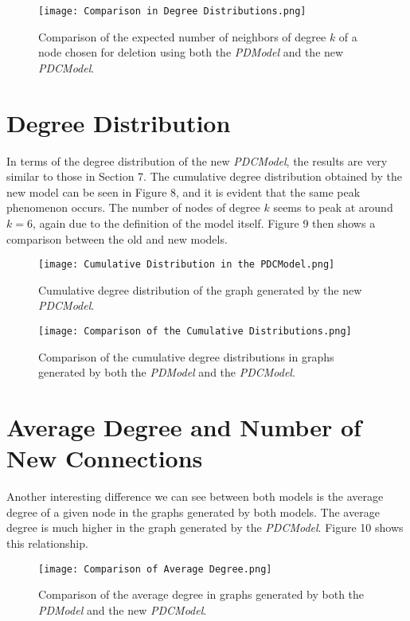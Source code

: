 \documentclass[final,3p,times,twocolumn]{elsarticle}
\begin{document}
\begin{figure}[h]
\centering\texttt{[image: Comparison in Degree Distributions.png]}
\caption{Comparison of the expected number of neighbors of degree $k$ of a node chosen for deletion using both the \textit{PDModel} and the new \textit{PDCModel}.}
\end{figure}

\section{Degree Distribution}
\label{S:8}

In terms of the degree distribution of the new \textit{PDCModel}, the results are very similar to those in Section 7. The cumulative degree distribution obtained by the new model can be seen in Figure 8, and it is evident that the same peak phenomenon occurs. The number of nodes of degree $k$ seems to peak at around $k = 6$, again due to the definition of the model itself. Figure 9 then shows a comparison between the old and new models.

\begin{figure}[h]
\centering\texttt{[image: Cumulative Distribution in the PDCModel.png]}
\caption{Cumulative degree distribution of the graph generated by the new \textit{PDCModel}.}
\end{figure}

\begin{figure}[h]
\centering\texttt{[image: Comparison of the Cumulative Distributions.png]}
\caption{Comparison of the cumulative degree distributions in graphs generated by both the \textit{PDModel} and the \textit{PDCModel}.}
\end{figure}

\section{Average Degree and Number of New Connections}
\label{S:9}

Another interesting difference we can see between both models is the average degree of a given node in the graphs generated by both models. The average degree is much higher in the graph generated by the \textit{PDCModel}. Figure 10 shows this relationship.

\begin{figure}[h]
\centering\texttt{[image: Comparison of Average Degree.png]}
\caption{Comparison of the average degree in graphs generated by both the \textit{PDModel} and the new \textit{PDCModel}.}
\end{figure}
\end{document}
